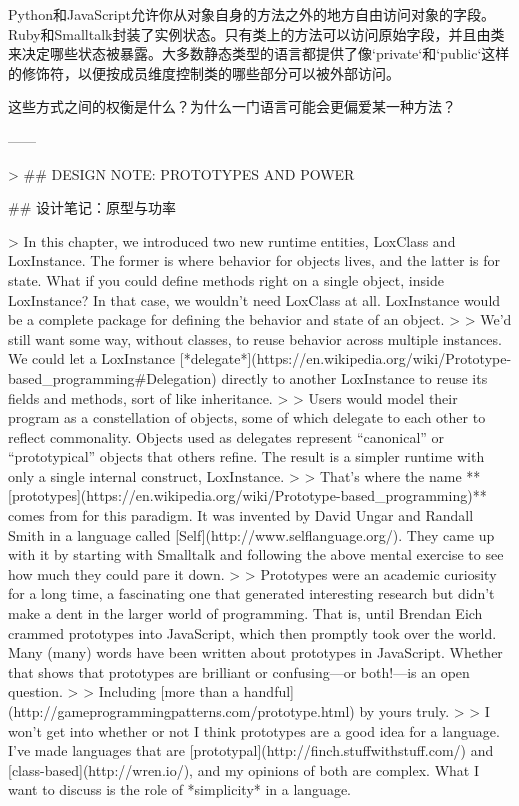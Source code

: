 \documentclass[cn,11pt,chinese]{elegantbook}
\begin{document}
   Python和JavaScript允许你从对象自身的方法之外的地方自由访问对象的字段。Ruby和Smalltalk封装了实例状态。只有类上的方法可以访问原始字段，并且由类来决定哪些状态被暴露。大多数静态类型的语言都提供了像`private`和`public`这样的修饰符，以便按成员维度控制类的哪些部分可以被外部访问。

   这些方式之间的权衡是什么？为什么一门语言可能会更偏爱某一种方法？

------

> ## DESIGN NOTE: PROTOTYPES AND POWER

## 设计笔记：原型与功率

> In this chapter, we introduced two new runtime entities, LoxClass and LoxInstance. The former is where behavior for objects lives, and the latter is for state. What if you could define methods right on a single object, inside LoxInstance? In that case, we wouldn’t need LoxClass at all. LoxInstance would be a complete package for defining the behavior and state of an object.
>
> We’d still want some way, without classes, to reuse behavior across multiple instances. We could let a LoxInstance [*delegate*](https://en.wikipedia.org/wiki/Prototype-based_programming#Delegation) directly to another LoxInstance to reuse its fields and methods, sort of like inheritance.
>
> Users would model their program as a constellation of objects, some of which delegate to each other to reflect commonality. Objects used as delegates represent “canonical” or “prototypical” objects that others refine. The result is a simpler runtime with only a single internal construct, LoxInstance.
>
> That’s where the name **[prototypes](https://en.wikipedia.org/wiki/Prototype-based_programming)** comes from for this paradigm. It was invented by David Ungar and Randall Smith in a language called [Self](http://www.selflanguage.org/). They came up with it by starting with Smalltalk and following the above mental exercise to see how much they could pare it down.
>
> Prototypes were an academic curiosity for a long time, a fascinating one that generated interesting research but didn’t make a dent in the larger world of programming. That is, until Brendan Eich crammed prototypes into JavaScript, which then promptly took over the world. Many (many) words have been written about prototypes in JavaScript. Whether that shows that prototypes are brilliant or confusing—or both!—is an open question.
>
> Including [more than a handful](http://gameprogrammingpatterns.com/prototype.html) by yours truly.
>
> I won’t get into whether or not I think prototypes are a good idea for a language. I’ve made languages that are [prototypal](http://finch.stuffwithstuff.com/) and [class-based](http://wren.io/), and my opinions of both are complex. What I want to discuss is the role of *simplicity* in a language.
\end{document}
